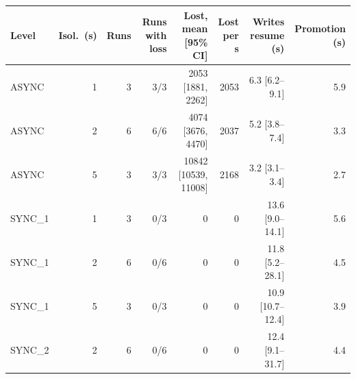 \begin{tabular}{lrrrrrrr}
\toprule
Level & Isol.\ (s) & Runs & Runs with loss & Lost, mean [95\% CI] & Lost per s & Writes resume (s) & Promotion (s) \\
\midrule
ASYNC & 1 & 3 & 3/3 & 2053 [1881, 2262] & 2053 & 6.3 [6.2--9.1] & 5.9 \\
ASYNC & 2 & 6 & 6/6 & 4074 [3676, 4470] & 2037 & 5.2 [3.8--7.4] & 3.3 \\
ASYNC & 5 & 3 & 3/3 & 10842 [10539, 11008] & 2168 & 3.2 [3.1--3.4] & 2.7 \\
SYNC\_1 & 1 & 3 & 0/3 & 0 & 0 & 13.6 [9.0--14.1] & 5.6 \\
SYNC\_1 & 2 & 6 & 0/6 & 0 & 0 & 11.8 [5.2--28.1] & 4.5 \\
SYNC\_1 & 5 & 3 & 0/3 & 0 & 0 & 10.9 [10.7--12.4] & 3.9 \\
SYNC\_2 & 2 & 6 & 0/6 & 0 & 0 & 12.4 [9.1--31.7] & 4.4 \\
\bottomrule
\end{tabular}
